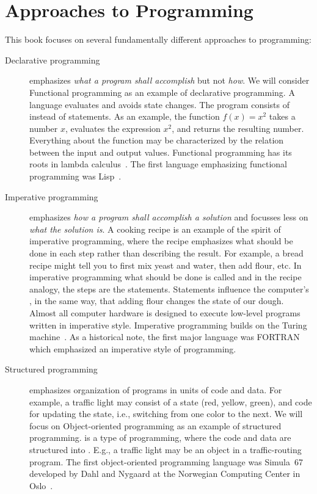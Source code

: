 \documentclass[fsharpNotes.tex]{subfiles}
\begin{document}
\section{Approaches to Programming}
This book focuses on several fundamentally different approaches to programming: 
\begin{description}
\item[Declarative programming] emphasizes \emph{what a program shall accomplish} but not \emph{how}. We will consider Functional programming as an example of declarative programming. A  language evaluates  and avoids state changes. The program consists of  instead of statements. As an example, the function $f(x) = x^2$ takes a number $x$, evaluates the expression $x^2$, and returns the resulting number. Everything about the function may be characterized by the relation between the input and output values.  Functional programming has its roots in lambda calculus~\cite{church36}. The first language emphasizing functional programming was Lisp~\cite{mccarthy60}. 
\item[Imperative programming] emphasizes \emph{how a program shall accomplish a solution} and focusses less on \emph{what the solution is}. A cooking recipe is an example of the spirit of imperative programming, where the recipe emphasizes what should be done in each step rather than describing the result. For example, a bread recipe might tell you to first mix yeast and water, then add flour, etc. In imperative programming what should be done is called  and in the recipe analogy, the steps are the statements. Statements influence the computer's , in the same way, that adding flour changes the state of our dough. Almost all computer hardware is designed to execute low-level programs written in imperative style. Imperative programming builds on the Turing machine~\cite{turing36}. As a historical note, the first major language was FORTRAN~\cite{backus54} which emphasized an imperative style of programming.
\item[Structured programming] emphasizes organization of programs in units of code and data. For example, a traffic light may consist of a state (red, yellow, green), and code for updating the state, i.e., switching from one color to the next. We will focus on Object-oriented programming as an example of structured programming.  is a type of programming, where the code and data are structured into . E.g., a traffic light may be an object in a traffic-routing program. The first object-oriented programming language was Simula~67 developed by Dahl and Nygaard at the Norwegian Computing Center in Oslo~\cite{dahl.nygaard67}.

\end{description}
\end{document}
